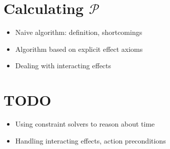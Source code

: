\section{Calculating $\mathcal{P}$}

\begin{itemize}
\item Naive algorithm: definition, shortcomings
\item Algorithm based on explicit effect axioms
\item Dealing with interacting effects
\end{itemize}

\section{TODO}
\begin{itemize}
\item Using constraint solvers to reason about time
\item Handling interacting effects, action preconditions
\end{itemize}

